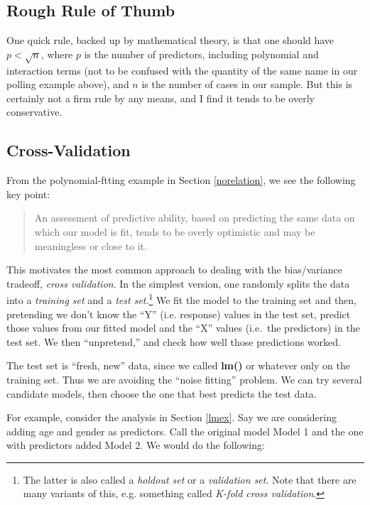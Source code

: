\subsection{Rough Rule of Thumb}

One quick rule, backed up by mathematical theory, is that one should
have $p < \sqrt{n}$, where $p$ is the number of predictors, including
polynomial and interaction terms (not to be confused with the quantity
of the same name in our polling example above), and $n$ is the number of
cases in our sample.  But this is certainly not a firm rule by any
means, and I find it tends to be overly conservative.

\subsection{Cross-Validation}

From the polynomial-ftting example in Section \ref{norelation}, we see
the following key point:

\begin{quote}
An assessment of predictive ability, based on predicting the same data
on which our model is fit, tends to be overly optimistic and may be
meaningless or close to it.
\end{quote}

This motivates the most common approach to dealing with the
bias/variance tradeoff, \textit{cross validation}.  In the simplest
version, one randomly splits the data into a \textit{training set} and a
\textit{test set}.\footnote{The latter is also called a \textit{holdout
set} or a \textit{validation set}.  Note that there are many variants of
this, e.g. something called \textit{K-fold cross validation}.}  We fit
the model to the training set and then, pretending we don't know the
``Y'' (i.e. response) values in the test set, predict those values from
our fitted model and the ``X'' values (i.e.\ the predictors) in the test
set.  We then ``unpretend,'' and check how well those predictions
worked. 

The test set is ``fresh, new'' data, since we called \textbf{lm()} or
whatever only on the training set.  Thus we are avoiding the ``noise
fitting'' problem.  We can try several candidate models, then choose the
one that best predicts the test data.

For example, consider the analysis in Section \ref{lmex}.  Say we are
considering adding age and gender as predictors.  Call the original
model Model 1 and the one with predictors added Model 2.  We would do
the following:

